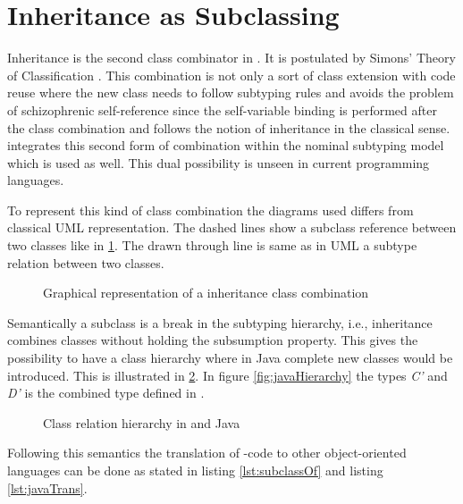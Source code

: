 \section{Inheritance as Subclassing}
Inheritance is the second class combinator in \ooplss. It is postulated
by Simons' Theory of Classification \cite{simons_theory_2004-2}.
This combination is not only a sort of class extension with code
reuse where the new class needs to follow subtyping rules and avoids
the problem of schizophrenic self-reference since the self-variable
binding is performed after the class combination and follows the notion
of inheritance in the classical sense. \ooplss integrates this second
form of combination within the nominal subtyping model which is used as
well. This dual possibility is unseen in current programming languages.

To represent this kind of class combination the diagrams used differs from classical
UML representation. The dashed lines show a subclass reference between two classes
like in \cref{fig:subclassCombination}. The drawn through line is same as in UML
a subtype relation between two classes.

\begin{figure}
	\centering
	\caption{Graphical representation of a inheritance class combination}
	\label{fig:subclassCombination}
\end{figure}

Semantically a subclass is a break in the subtyping hierarchy, i.e., inheritance
combines classes without holding the subsumption property. This gives \ooplss
the possibility to have a class hierarchy where in Java complete new classes
would be introduced. This is illustrated in \cref{fig:inheritHierarchy}. In figure
\ref{fig:javaHierarchy} the types \emph{C'} and \emph{D'} is the combined type
defined in \ooplss.

\begin{figure}
	\centering
	\caption{Class relation hierarchy in \ooplss and Java}
	\label{fig:inheritHierarchy}
\end{figure}

Following this semantics the translation of \ooplss-code to
other object-oriented languages can be done as stated in listing
\ref{lst:subclassOf} and listing \ref{lst:javaTrans}.

